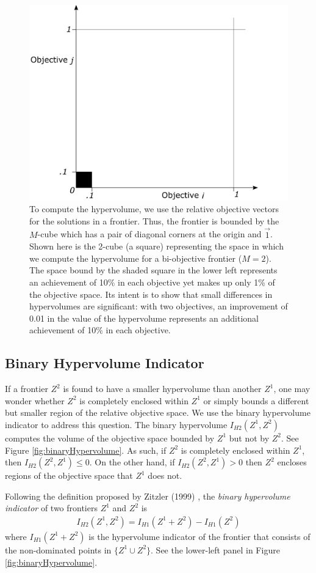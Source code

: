 \begin{figure}
\centering
\includegraphics[width=.5\textwidth]{../images/HypervolumeImprovements}
\caption[Interpreting differences in hypervolumes]{To compute the hypervolume, we use the relative objective vectors for the solutions in a frontier. Thus, the frontier is bounded by the $M$-cube which has a pair of diagonal corners at the origin and $\vec{1}$. Shown here is the 2-cube (a square) representing the space in which we compute the hypervolume for a bi-objective frontier ($M=2$). The space bound by the shaded square in the lower left represents an achievement of 10\% in each objective yet makes up only 1\% of the objective space. Its intent is to show that small differences in hypervolumes are significant: with two objectives, an improvement of 0.01 in the value of the hypervolume represents an additional achievement of 10\% in each objective.}
\label{fig:Hypervol10percent}
\end{figure}

\subsection{Binary Hypervolume Indicator}
If a frontier $Z^2$ is found to have a smaller hypervolume than another $Z^1$, one may wonder whether $Z^2$ is completely enclosed within $Z^1$ or simply bounds a different but smaller region of the relative objective space. We use the binary hypervolume indicator to address this question. The binary hypervolume $I_{H2}(Z^1,Z^2)$ computes the volume of the objective space bounded by $Z^1$ but not by $Z^2$. See Figure \ref{fig:binaryHypervolume}. As such, if $Z^2$ is completely enclosed within $Z^1$, then $I_{H2}(Z^2,Z^1) \le 0$. On the other hand, if $I_{H2}(Z^2,Z^1) > 0$ then $Z^2$ encloses regions of the objective space that $Z^1$ does not.

Following the definition proposed by Zitzler (1999) \cite{zitzler1999evolutionary}, the \textit{binary hypervolume indicator} of two frontiers $Z^1$ and $Z^2$ is \cite{zitzler1999evolutionary}
\begin{align}
I_{H2} (Z^1,Z^2) = I_{H1} (Z^1 + Z^2) - I_{H1} (Z^2)
\end{align}
where $I_{H1} (Z^1 + Z^2)$ is the hypervolume indicator of the frontier that consists of the non-dominated points in $\{Z^1 \cup Z^2\}$. See the lower-left panel in Figure \ref{fig:binaryHypervolume}.

